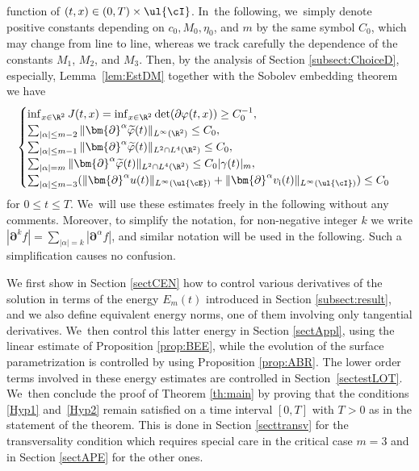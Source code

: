 function of $(t,x)\in(0,T)\times\ul{\cI}$. In~the following, we~simply denote positive constants depending on $c_0,M_0,\eta_0$, and $m$ by the same symbol $C_0$, which may change from line to line,
whereas we track carefully the dependence of the constants $M_1$, $M_2$, and $M_3$.
Then, by the analysis of Section \ref{subsect:ChoiceD}, especially, Lemma~\ref{lem:EstDM} together with the Sobolev embedding theorem we have
\[
\begin{cases}
\inf_{x\in\R^2}J(t,x) = \inf_{x\in\R^2}\det(\partial\varphi(t,x)) \geq C_0^{-1}, \\
\sum_{|\alpha| \leq m-2} \|\bm{\partial}^\alpha\widetilde{\varphi}(t)\|_{L^\infty(\R^2)} \leq C_0, \\
\sum_{|\alpha| \leq m-1} \|\bm{\partial}^\alpha\widetilde{\varphi}(t)\|_{L^2\cap L^4(\R^2)} \leq C_0, \\
\sum_{|\alpha| = m} \|\bm{\partial}^\alpha\widetilde{\varphi}(t)\|_{L^2\cap L^4(\R^2)} \leq C_0|\gamma(t)|_m, \\
\sum_{|\alpha| \leq m-3}(\|\bm{\partial}^\alpha u(t)\|_{L^\infty(\ul{\cE})} + \|\bm{\partial}^\alpha v_\mathrm{i}(t)\|_{L^\infty(\ul{\cI})}) \leq C_0
\end{cases}
\]
for $0\leq t\leq T$. We~will use these estimates freely in the following without any comments.
Moreover, to simplify the notation, for non-negative integer $k$ we write $|\bm{\partial}^k f|=\sum_{|\alpha|=k}|\bm{\partial}^\alpha f|$, and
similar notation will be used in the following.
Such a simplification causes no confusion.

We first show in Section \ref{sectCEN} how to control various derivatives of the solution in terms of the energy $E_m(t)$
introduced in Section \ref{subsect:result}, and we also define equivalent energy norms, one of them involving only tangential derivatives. We~then control this latter energy in Section \ref{sectAppl}, using the linear estimate of Proposition \ref{prop:BEE},
while the evolution of the surface parametrization is controlled by using Proposition \ref{prop:ABR}.
The lower order terms involved in these energy estimates are controlled in Section~\ref{sectestLOT}. We~then conclude the proof of Theorem \ref{th:main} by proving that the conditions \eqref{Hyp1} and~\eqref{Hyp2} remain satisfied
on a time interval $[0,T]$ with $T>0$ as in the statement of the theorem.
This is done in Section \ref{secttransv} for the transversality condition which requires special care in the critical case $m=3$
and in Section \ref{sectAPE} for the other ones.

